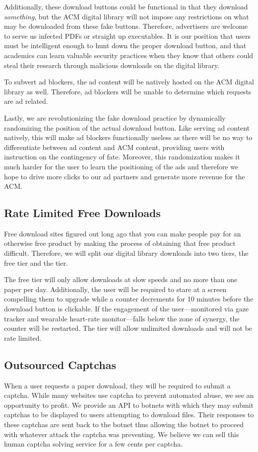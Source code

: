 Additionally, these download buttons could be functional in that they download
\textit{something}, but the ACM digital library will not impose any
restrictions on what may be downloaded from these fake buttons.
Therefore, advertisers are welcome to serve us infected PDFs or straight up
executables.
It is our position that users must be intelligent enough to hunt down the
proper download button, and that academics can learn valuable security
practices when they know that others could steal their research through
malicious downloads on the digital library.

To subvert ad blockers, the ad content will be natively hosted on the ACM
digital library as well.
Therefore, ad blockers will be unable to determine which requests are ad
related.

Lastly, we are revolutionizing the fake download practice by dynamically
randomizing the position of the actual download button.
Like serving ad content natively, this will make ad blockers functionally
useless as there will be no way to differentiate between ad content and ACM
content, providing users with instruction on the contingency of fate.
Moreover, this randomization makes it much harder for the user to learn the
positioning of the ads and therefore we hope to drive more clicks to our ad
partners and generate more revenue for the ACM.

\subsection{Rate Limited Free Downloads}
\label{sec:limit}
Free download sites figured out long ago that you can make people pay for an
otherwise free product by making the process of obtaining that free product
difficult.
Therefore, we will split our digital library downloads into two tiers, the free
tier and the \premium tier.

The free tier will only allow downloads at slow speeds and no more than one
paper per day.
Additionally, the user will be required to stare at a screen compelling them to
upgrade while a counter decrements for 10 minutes before the download button is
clickable.
If the engagement of the user---monitored via gaze tracker and wearable heart-rate monitor---falls below the zone of synergy, the counter will be restarted.
The \premium tier will allow unlimited downloads and will not be rate limited.


\subsection{Outsourced Captchas}
When a user requests a paper download, they will be required to submit a
captcha.
While many websites use captcha to prevent automated abuse, we see an
opportunity to profit.
We provide an API to botnets with which they may submit captchas to be
displayed to users attempting to download files.
Their responses to these captchas are sent back to the botnet thus allowing the
botnet to proceed with whatever attack the captcha was preventing.
We believe we can sell this human captcha solving service for a few cents per
captcha.

